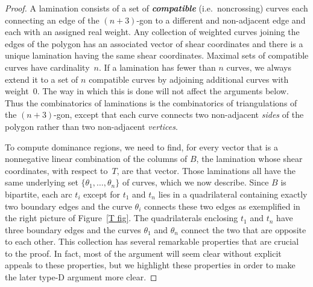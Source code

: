 \documentclass[10pt]{article}
\theoremstyle{definition}
\theoremstyle{remark}
\numberwithin{equation}{section}
\newcommand{\newword}[1]{\textbf{\emph{#1}}}
\newcommand{\set}[1]{{\lbrace #1 \rbrace}}
\newcommand{\0}{{\mathbf{0}}}
\begin{document}
\begin{proof}
A lamination consists of a set of \newword{compatible} (i.e.\ noncrossing) curves each connecting an edge of the $(n+3)$-gon to a different and non-adjacent edge and each with an assigned real weight.
Any collection of weighted curves joining the edges of the polygon has an associated vector of shear coordinates and there is a unique lamination having the same shear coordinates.
Maximal sets of compatible curves have cardinality~$n$.
If a lamination has fewer than $n$ curves, we always extend it to a set of $n$ compatible curves by adjoining additional curves with weight~$0$.
The way in which this is done will not affect the arguments below.
Thus the combinatorics of laminations is the combinatorics of triangulations of the $(n+3)$-gon, except that each curve connects two non-adjacent \emph{sides} of the polygon rather than two non-adjacent \emph{vertices}.

To compute dominance regions, we need to find, for every vector that is a nonnegative linear combination of the columns of $B$, the lamination whose shear coordinates, with respect to~$T$, are that vector.
Those laminations all have the same underlying set $\set{\theta_1,\ldots,\theta_n}$ of curves, which we now describe.
Since $B$ is bipartite, each arc $t_i$ except for $t_1$ and $t_n$ lies in a quadrilateral containing exactly two boundary edges and the curve $\theta_i$ connects these two edges as exemplified in the right picture of Figure~\ref{T fig}.
The quadrilaterals enclosing $t_1$ and $t_n$ have three boundary edges and the curves $\theta_1$ and $\theta_n$ connect the two that are opposite to each other. 
This collection has several remarkable properties that are crucial to the proof.  
In fact, most of the argument will seem clear without explicit appeals to these properties, but we highlight these properties in order to make the later type-D argument more clear.


\end{proof}
\end{document}

